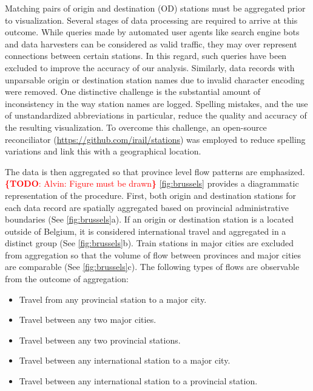 \documentclass{sig-alternate}
\newcommand{\todo}[1]{\noindent\textcolor{red}{{\bf \{TODO}: #1{\bf \}}}}
\begin{document}
Matching pairs of origin and destination (OD) stations must be aggregated prior to visualization.
Several stages of data processing are required to arrive at this outcome.
While queries made by automated user agents like search engine bots and data harvesters can be considered as valid traffic, they may over represent connections between certain stations.
In this regard, such queries have been excluded to improve the accuracy of our analysis. 
Similarly, data records with unparsable origin or destination station names due to invalid character encoding were removed. 
One distinctive challenge is the substantial amount of inconsistency in the way station names are logged. 
Spelling mistakes, and the use of unstandardized abbreviations in particular, reduce the quality and accuracy of the resulting visualization.
To overcome this challenge, an open-source reconciliator (\url{https://github.com/irail/stations}) was employed to reduce spelling variations and link this with a geographical location. 

The data is then aggregated so that province level flow patterns are emphasized.
\todo{Alvin: Figure must be drawn}
\cref{fig:brussels} provides a diagrammatic representation of the procedure.
First, both origin and destination stations for each data record are spatially aggregated based on provincial administrative boundaries (See \cref{fig:brussels}a).
If an origin or destination station is a located outside of Belgium, it is considered international travel and aggregated in a distinct group (See \cref{fig:brussels}b).
Train stations in major cities are excluded from aggregation so that the volume of flow between provinces and major cities are comparable (See \cref{fig:brussels}c).
The following types of flows are observable from the outcome of aggregation:

\begin{itemize}
  \item Travel from any provincial station to a major city.
  \item Travel between any two major cities.
  \item Travel between any two provincial stations.
  \item Travel between any international station to a major city.
  \item Travel between any international station to a provincial station.
\end{itemize}
\end{document}

